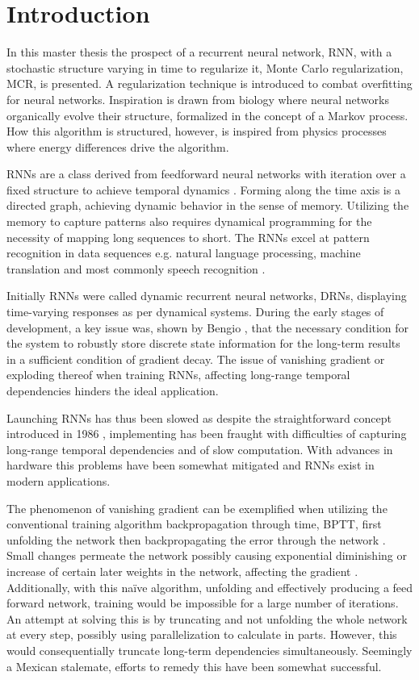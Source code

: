 
\chapter{Introduction}

In this master thesis the prospect of a recurrent neural network, RNN, with a stochastic structure varying in time to regularize it, Monte Carlo regularization, MCR, is presented. A regularization technique is introduced to combat overfitting for neural networks. Inspiration is drawn from biology where neural networks organically evolve their structure, formalized in the concept of a Markov process. How this algorithm is structured, however, is inspired from physics processes where energy differences drive the algorithm. 

RNNs are a class derived from feedforward neural networks with iteration over a fixed structure to achieve temporal dynamics \cite{DRNNS}. Forming along the time axis is a directed graph, achieving dynamic behavior in the sense of memory. Utilizing the memory to capture patterns also requires dynamical programming for the necessity of mapping long sequences to short. The RNNs excel at pattern recognition in data sequences e.g. natural language processing, machine translation and most commonly speech recognition \cite{handwriting}. 

Initially RNNs were called dynamic recurrent neural networks, DRNs, displaying time-varying responses as per dynamical systems. During the early stages of development, a key issue was, shown by Bengio \cite{ben}, that the necessary condition for the system to robustly store discrete state information for the long-term results in a sufficient condition of gradient decay. The issue of vanishing gradient \cite{hoch} or exploding thereof when training RNNs, affecting long-range temporal dependencies hinders the ideal application. 

Launching RNNs has thus been slowed as despite the straightforward concept introduced in 1986 \cite{RNN1}, implementing has been fraught with difficulties of capturing long-range temporal dependencies and of slow computation. With advances in hardware this problems have been somewhat mitigated and RNNs exist in modern applications.

The phenomenon of vanishing gradient can be exemplified when utilizing the conventional training algorithm backpropagation through time, BPTT, first unfolding the network then backpropagating the error through the network \cite{DRNNS}. Small changes permeate the network possibly causing exponential diminishing or increase of certain later weights in the network, affecting the gradient \cite{field}. Additionally, with this naïve algorithm, unfolding and effectively producing a feed forward network, training would be impossible for a large number of iterations. An attempt at solving this is by truncating and not unfolding the whole network at every step, possibly using parallelization to calculate in parts. However, this would consequentially truncate long-term dependencies simultaneously. Seemingly a Mexican stalemate, efforts to remedy this have been somewhat successful. 

